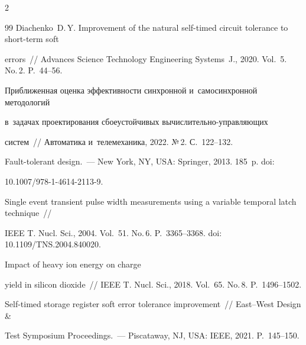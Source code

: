 \begin{multicols}{2}
{{\begin{thebibliography}{99}
{Diachenko~D.\,Y.} Improvement of the natural self-timed circuit tolerance to short-term soft 

errors~// Advances Science Technology Engineering Systems~J., 2020. Vol.~5. No.\,2. P.~44--56. 



Приближенная оценка эффективности синхронной и~самосинхронной методологий 

в~задачах проектирования сбоеустойчивых вы\-чис\-ли\-тель\-но-управ\-ля\-ющих  

сис\-тем~// Автоматика и~телемеханика, 2022. №\,2. С.~122--132.


  Fault-tolerant design.~--- New York, NY, USA: Springer, 2013. 185~p. doi: 

10.1007/978-1-4614-2113-9.



Single event transient pulse width measurements using a variable temporal latch technique~// 

IEEE T. Nucl. Sci., 2004. Vol.~51. No.\,6. P.~3365--3368. doi: 10.1109/TNS.2004.840020.


  Impact of heavy ion energy on charge 

yield in silicon dioxide~// IEEE T. Nucl. Sci., 2018. Vol.~65. No.\,8. P.~1496--1502.



Self-timed storage register soft error tolerance improvement~// East--West Design \& 

Test Symposium Proceedings.~--- Piscataway, NJ, USA: IEEE, 2021. P.~145--150.



\end{thebibliography}



 }

 }



\end{multicols}



